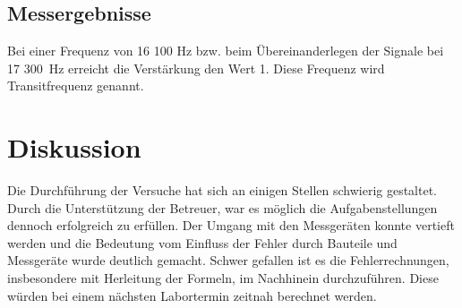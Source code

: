 \documentclass[a4paper,12pt]{article}
\begin{document}
\subsection{Messergebnisse}
\begin{table}[H]
	\centering
{}
	\caption{Frequenzgang des aktiven Tiefpasses}
\end{table}
Bei einer Frequenz von 16 100 Hz bzw. beim Übereinanderlegen der Signale bei 17 300~Hz erreicht die Verstärkung den Wert 1. Diese Frequenz wird Transitfrequenz genannt.














\section{Diskussion}
Die Durchführung der Versuche hat sich an einigen Stellen schwierig gestaltet. Durch die Unterstützung der Betreuer, war es möglich die Aufgabenstellungen dennoch erfolgreich zu erfüllen. Der Umgang mit den Messgeräten konnte vertieft werden und die Bedeutung vom Einfluss der Fehler durch Bauteile und Messgeräte wurde deutlich gemacht. Schwer gefallen ist es die Fehlerrechnungen, insbesondere mit Herleitung der Formeln, im Nachhinein durchzuführen. Diese würden bei einem nächsten Labortermin zeitnah berechnet werden.\\
\end{document}
